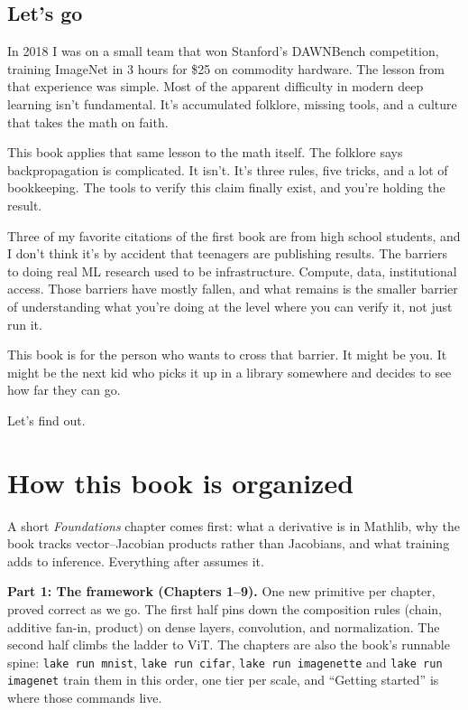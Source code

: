 \section*{Let's go}

In 2018 I was on a small team that won Stanford's DAWNBench competition,
training ImageNet in 3 hours for \$25 on commodity hardware. The lesson
from that experience was simple. Most of the apparent difficulty in
modern deep learning isn't fundamental. It's accumulated folklore,
missing tools, and a culture that takes the math on faith.

This book applies that same lesson to the math itself. The folklore says
backpropagation is complicated. It isn't. It's three rules, five tricks,
and a lot of bookkeeping. The tools to verify this claim finally exist,
and you're holding the result.

Three of my favorite citations of the first book are from high school
students, and I don't think it's by accident that teenagers are
publishing results. The barriers to doing real ML research used to be
infrastructure. Compute, data, institutional access. Those barriers have
mostly fallen, and what remains is the smaller barrier of understanding
what you're doing at the level where you can verify it, not just run it.

This book is for the person who wants to cross that barrier. It might be
you. It might be the next kid who picks it up in a library somewhere and
decides to see how far they can go.

Let's find out.

\chapter*{How this book is organized}

A short \emph{Foundations} chapter comes first: what a derivative is in
Mathlib, why the book tracks vector--Jacobian products rather than
Jacobians, and what training adds to inference. Everything after assumes it.

\textbf{Part 1: The framework (Chapters 1--9).} One new primitive per
chapter, proved correct as we go. The first half pins down the
composition rules (chain, additive fan-in, product) on dense layers,
convolution, and normalization. The second half climbs the ladder to ViT.
The chapters are also the book's runnable spine: \texttt{lake run mnist},
\texttt{lake run cifar}, \texttt{lake run imagenette} and \texttt{lake run
imagenet} train them in this order, one tier per scale, and ``Getting
started'' is where those commands live.


